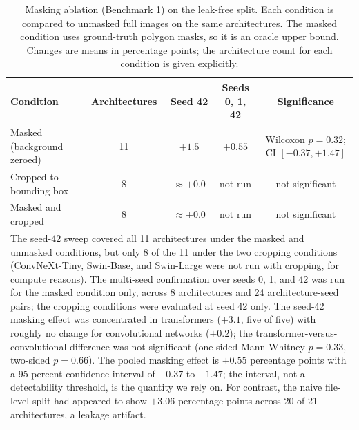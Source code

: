 \documentclass{elektr}
\newcommand{\vs}{\vspace}
\begin{document}
\begin{table}[!ht]
\caption{Masking ablation (Benchmark 1) on the leak-free split. Each condition is compared to unmasked full images on the same architectures. The masked condition uses ground-truth polygon masks, so it is an oracle upper bound. Changes are means in percentage points; the architecture count for each condition is given explicitly.}
\begin{center}
\small
\begin{tabular}{|l|c|c|c|c|}
\hline
Condition & Architectures & Seed 42 & Seeds 0, 1, 42 & Significance \\
\hline
Masked (background zeroed) & 11 & $+1.5$ & $+0.55$ & Wilcoxon $p=0.32$; CI $[-0.37,+1.47]$ \\
Cropped to bounding box & 8 & $\approx +0.0$ & not run & not significant \\
Masked and cropped & 8 & $\approx +0.0$ & not run & not significant \\
\hline
\multicolumn{5}{|p{0.92\textwidth}|}{The seed-42 sweep covered all 11 architectures under the masked and unmasked conditions, but only 8 of the 11 under the two cropping conditions (ConvNeXt-Tiny, Swin-Base, and Swin-Large were not run with cropping, for compute reasons). The multi-seed confirmation over seeds 0, 1, and 42 was run for the masked condition only, across 8 architectures and 24 architecture-seed pairs; the cropping conditions were evaluated at seed 42 only. The seed-42 masking effect was concentrated in transformers ($+3.1$, five of five) with roughly no change for convolutional networks ($+0.2$); the transformer-versus-convolutional difference was not significant (one-sided Mann-Whitney $p=0.33$, two-sided $p=0.66$). The pooled masking effect is $+0.55$ percentage points with a 95 percent confidence interval of $-0.37$ to $+1.47$; the interval, not a detectability threshold, is the quantity we rely on. For contrast, the naive file-level split had appeared to show $+3.06$ percentage points across 20 of 21 architectures, a leakage artifact.} \\
\hline
\end{tabular}
\label{tab:mask}
\end{center}\vs{-4mm}
\end{table}
\end{document}
